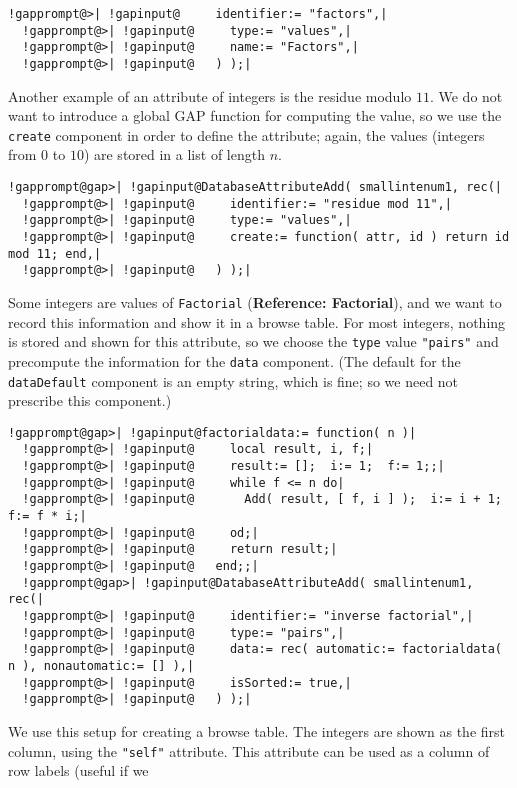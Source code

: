 \documentclass[a4paper,11pt]{report}
\begin{document}
{{\begin{Verbatim}[commandchars=!@|,fontsize=\small,frame=single,label=Example]
  !gapprompt@>| !gapinput@     identifier:= "factors",|
  !gapprompt@>| !gapinput@     type:= "values",|
  !gapprompt@>| !gapinput@     name:= "Factors",|
  !gapprompt@>| !gapinput@   ) );|
\end{Verbatim}
 Another example of an attribute of integers is the residue modulo $11$. We do not want to introduce a global \textsf{GAP} function for computing the value, so we use the \texttt{create} component in order to define the attribute; again, the values (integers from $0$ to $10$) are stored in a list of length $n$. 
\begin{Verbatim}[commandchars=!@|,fontsize=\small,frame=single,label=Example]
  !gapprompt@gap>| !gapinput@DatabaseAttributeAdd( smallintenum1, rec(|
  !gapprompt@>| !gapinput@     identifier:= "residue mod 11",|
  !gapprompt@>| !gapinput@     type:= "values",|
  !gapprompt@>| !gapinput@     create:= function( attr, id ) return id mod 11; end,|
  !gapprompt@>| !gapinput@   ) );|
\end{Verbatim}
 Some integers are values of \texttt{Factorial} (\textbf{Reference: Factorial}), and we want to record this information and show it in a browse table. For
most integers, nothing is stored and shown for this attribute, so we choose
the \texttt{type} value \texttt{"pairs"} and precompute the information for the \texttt{data} component. (The default for the \texttt{dataDefault} component is an empty string, which is fine; so we need not prescribe this
component.) 
\begin{Verbatim}[commandchars=!@|,fontsize=\small,frame=single,label=Example]
  !gapprompt@gap>| !gapinput@factorialdata:= function( n )|
  !gapprompt@>| !gapinput@     local result, i, f;|
  !gapprompt@>| !gapinput@     result:= [];  i:= 1;  f:= 1;;|
  !gapprompt@>| !gapinput@     while f <= n do|
  !gapprompt@>| !gapinput@       Add( result, [ f, i ] );  i:= i + 1;  f:= f * i;|
  !gapprompt@>| !gapinput@     od;|
  !gapprompt@>| !gapinput@     return result;|
  !gapprompt@>| !gapinput@   end;;|
  !gapprompt@gap>| !gapinput@DatabaseAttributeAdd( smallintenum1, rec(|
  !gapprompt@>| !gapinput@     identifier:= "inverse factorial",|
  !gapprompt@>| !gapinput@     type:= "pairs",|
  !gapprompt@>| !gapinput@     data:= rec( automatic:= factorialdata( n ), nonautomatic:= [] ),|
  !gapprompt@>| !gapinput@     isSorted:= true,|
  !gapprompt@>| !gapinput@   ) );|
\end{Verbatim}
 We use this setup for creating a browse table. The integers are shown as the
first column, using the \texttt{"self"} attribute. This attribute can be used as a column of row labels (useful if we
}}
\end{document}
